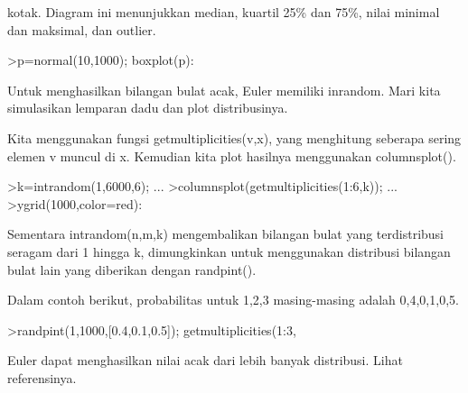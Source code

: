 \documentclass[a4paper,10pt]{article}
\begin{document}
\begin{eulernotebook}
\begin{eulercomment}
\begin{eulercomment}
\begin{eulercomment}
\begin{eulercomment}
\begin{eulercomment}
\begin{eulercomment}
\begin{eulercomment}
\begin{eulercomment}
\begin{eulercomment}
\begin{eulercomment}
\begin{eulercomment}
\begin{eulercomment}
\begin{eulercomment}
\begin{eulercomment}
\begin{eulercomment}
\begin{eulercomment}
\begin{eulercomment}
\begin{eulercomment}
\begin{eulercomment}
\begin{eulercomment}
\begin{eulercomment}
\begin{eulercomment}
\begin{eulercomment}
\begin{eulercomment}
\begin{eulercomment}
\begin{eulercomment}
\begin{eulercomment}
\begin{eulercomment}
\begin{eulercomment}
\begin{eulercomment}
\begin{eulercomment}
\begin{eulercomment}
\begin{eulercomment}
kotak. Diagram ini menunjukkan median, kuartil 25\% dan 75\%, nilai
minimal dan maksimal, dan outlier.
\end{eulercomment}
\begin{eulerprompt}
>p=normal(10,1000); boxplot(p):
\end{eulerprompt}
\begin{eulercomment}
Untuk menghasilkan bilangan bulat acak, Euler memiliki inrandom. Mari
kita simulasikan lemparan dadu dan plot distribusinya.

Kita menggunakan fungsi getmultiplicities(v,x), yang menghitung
seberapa sering elemen v muncul di x. Kemudian kita plot hasilnya
menggunakan columnsplot().
\end{eulercomment}
\begin{eulerprompt}
>k=intrandom(1,6000,6);  ...
>columnsplot(getmultiplicities(1:6,k));  ...
>ygrid(1000,color=red):
\end{eulerprompt}
\begin{eulercomment}
Sementara intrandom(n,m,k) mengembalikan bilangan bulat yang
terdistribusi seragam dari 1 hingga k, dimungkinkan untuk menggunakan
distribusi bilangan bulat lain yang diberikan dengan randpint().

Dalam contoh berikut, probabilitas untuk 1,2,3 masing-masing adalah
0,4,0,1,0,5.
\end{eulercomment}
\begin{eulerprompt}
>randpint(1,1000,[0.4,0.1,0.5]); getmultiplicities(1:3,%
\end{eulerprompt}
\begin{euleroutput}
  [394,  107,  499]
\end{euleroutput}
\begin{eulercomment}
Euler dapat menghasilkan nilai acak dari lebih banyak distribusi.
Lihat referensinya.


\end{eulercomment}
\end{eulercomment}
\end{eulercomment}
\end{eulercomment}
\end{eulercomment}
\end{eulercomment}
\end{eulercomment}
\end{eulercomment}
\end{eulercomment}
\end{eulercomment}
\end{eulercomment}
\end{eulercomment}
\end{eulercomment}
\end{eulercomment}
\end{eulercomment}
\end{eulercomment}
\end{eulercomment}
\end{eulercomment}
\end{eulercomment}
\end{eulercomment}
\end{eulercomment}
\end{eulercomment}
\end{eulercomment}
\end{eulercomment}
\end{eulercomment}
\end{eulercomment}
\end{eulercomment}
\end{eulercomment}
\end{eulercomment}
\end{eulercomment}
\end{eulercomment}
\end{eulercomment}
\end{eulercomment}
\end{eulernotebook}
\end{document}
